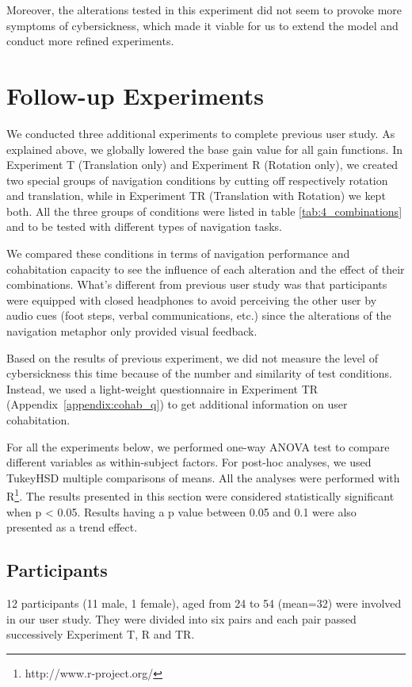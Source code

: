 Moreover, the alterations tested in this experiment did not seem to provoke more symptoms of cybersickness, which made it viable for us to extend the model and conduct more refined experiments.

\section{Follow-up Experiments}
We conducted three additional experiments to complete previous user study. As explained above, we globally lowered the base gain value for all gain functions. In Experiment T (Translation only) and Experiment R (Rotation only), we created two special groups of navigation conditions by cutting off respectively rotation and translation, while in Experiment TR (Translation with Rotation) we kept both. All the three groups of conditions were listed in table \ref{tab:4_combinations} and to be tested with different types of navigation tasks. 

We compared these conditions in terms of navigation performance and cohabitation capacity to see the influence of each alteration and the effect of their combinations. What's different from previous user study was that participants were equipped with closed headphones to avoid perceiving the other user by audio cues (foot steps, verbal communications, etc.) since the alterations of the navigation metaphor only provided visual feedback.

Based on the results of previous experiment, we did not measure the level of cybersickness this time because of the number and similarity of test conditions. Instead, we used a light-weight questionnaire in Experiment TR (Appendix~\ref{appendix:cohab_q}) to get additional information on user cohabitation.

For all the experiments below, we performed one-way ANOVA test to compare different variables as within-subject factors. For post-hoc analyses, we used TukeyHSD multiple comparisons of means. All the analyses were performed with R\footnote{http://www.r-project.org/}. The results presented in this section were considered statistically significant when p \textless{} 0.05. Results having a p value between 0.05 and 0.1 were also presented as a trend effect.

\subsection{Participants}
12 participants (11 male, 1 female), aged from 24 to 54 (mean=32) were involved in our user study. They were divided into six pairs and each pair passed successively Experiment T, R and TR.


